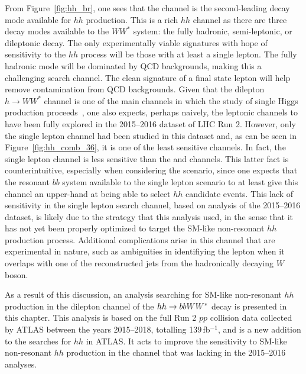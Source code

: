 From Figure~\ref{fig:hh_br}, one sees that the \bbww channel is the second-leading decay mode
available for $hh$ production.
This is a rich $hh$ channel as there are three decay modes available to the $WW^*$ system: the fully hadronic, semi-leptonic, or dileptonic decay.
The only experimentally viable signatures with hope of sensitivity to the $hh$ process will be those with at least a single lepton.
The fully hadronic mode will be dominated by QCD backgrounds, making this a challenging search channel.
The clean signature of a final state lepton will help remove contamination from QCD backgrounds.
Given that the dilepton $h \rightarrow WW^*$ channel is one of the main channels in which the study
of single Higgs production proceeds~\cite{Aaboud:2018jqu,Aad:2016lvc,ATLAS:2014aga}, one also expects, perhaps naively, the leptonic \bbww 
channels to have been fully explored in the 2015--2016 dataset of LHC Run 2.
However, only the single lepton channel had been studied in this dataset and, as can be seen in Figure~\ref{fig:hh_comb_36},
it is one of the least sensitive channels.
In fact, the single lepton \bbww channel is less sensitive than the \wwww and \wwyy channels.
This latter fact is counterintuitive, especially when considering the \wwww scenario, since
one expects that the resonant $bb$ system available to the single lepton \bbww scenario
to at least give this channel an upper-hand at being able to select $hh$ candidate events.
This lack of sensitivity in the single lepton \bbww search channel, based on analysis of the 2015--2016 dataset, is likely due
to the strategy that this analysis used, in the sense that it has not yet been properly optimized to target
the SM-like non-resonant $hh$ production process.
Additional complications arise in this channel that are experimental in nature, such as ambiguities
in identifiying the lepton when it overlaps with one of the reconstructed jets from the hadronically decaying $W$
boson.

As a result of this discussion, an analysis searching for SM-like non-resonant $hh$ production in the dilepton channel
of the $hh \rightarrow bbWW^*$ decay is presented in this chapter.
This analysis is based on the full Run 2 $pp$ collision data collected by ATLAS between the years
2015--2018, totalling 139\,fb$^{-1}$, and is a new addition to the searches for $hh$ in ATLAS.
It acts to improve the sensitivity to SM-like non-resonant $hh$ production in the \bbww channel that
was lacking in the 2015--2016 analyses.

